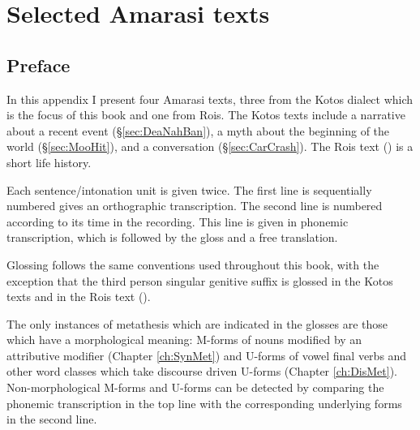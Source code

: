 \chapter{Selected Amarasi texts}\label{app:SelAmaTex}


\section{Preface}
In this appendix I present four Amarasi texts,
three from the Kotos dialect which is the focus of this
book and one from Ro{\Q}is.
The Kotos texts include a narrative about a recent event (\S\ref{sec:DeaNahBan}),
a myth about the beginning of the world (\S\ref{sec:MooHit}),
and a conversation (\S\ref{sec:CarCrash}).
The Ro{\Q}is text () is a short life history.

Each sentence/intonation unit is given twice.
The first line is sequentially numbered gives an orthographic transcription.
The second line is numbered according to its time in the recording.
This line is given in phonemic transcription,
which is followed by the gloss and a free translation.

Glossing follows the same conventions used throughout this book,
with the exception that the third person singular genitive
suffix  is glossed  in the Kotos texts
and  in the Ro{\Q}is text ().

The only instances of metathesis which are indicated in the glosses
are those which have a morphological meaning:
M-forms of nouns modified by an attributive modifier (Chapter \ref{ch:SynMet})
and U-forms of vowel final verbs and other word classes
which take discourse driven U-forms (Chapter \ref{ch:DisMet}).
Non-morphological M-forms and U-forms
can be detected by comparing the phonemic transcription in the top line
with the corresponding underlying forms in the second line.

\renewcommand{\N}{\tsc{3gen}}




